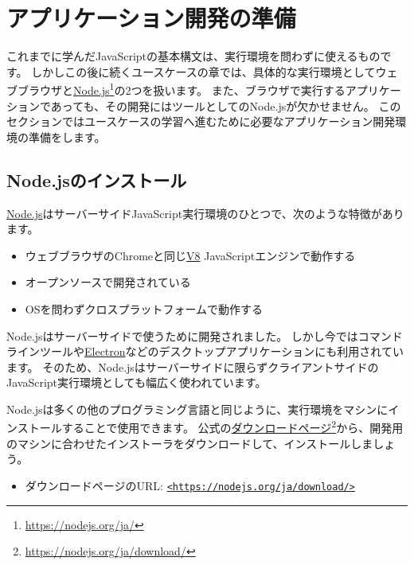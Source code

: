 \hypertarget{setup-local-env}{%
\chapter{アプリケーション開発の準備}\label{setup-local-env}}
\thispagestyle{frontheadings}

これまでに学んだJavaScriptの基本構文は、実行環境を問わずに使えるものです。
しかしこの後に続くユースケースの章では、具体的な実行環境としてウェブブラウザと\href{https://nodejs.org/ja/}{Node.js}\footnote{\url{https://nodejs.org/ja/}}の2つを扱います。
また、ブラウザで実行するアプリケーションであっても、その開発にはツールとしてのNode.jsが欠かせません。
このセクションではユースケースの学習へ進むために必要なアプリケーション開発環境の準備をします。

\hypertarget{install-nodejs}{%
\section{Node.jsのインストール}\label{install-nodejs}}

\href{https://nodejs.org/ja/}{Node.js}はサーバーサイドJavaScript実行環境のひとつで、次のような特徴があります。

\begin{itemize}
\item
  ウェブブラウザのChromeと同じ\href{https://v8.dev/}{V8}
  JavaScriptエンジンで動作する
\item
  オープンソースで開発されている
\item
  OSを問わずクロスプラットフォームで動作する
\end{itemize}

Node.jsはサーバーサイドで使うために開発されました。
しかし今ではコマンドラインツールや\href{https://www.electronjs.org/}{Electron}などのデスクトップアプリケーションにも利用されています。
そのため、Node.jsはサーバーサイドに限らずクライアントサイドのJavaScript実行環境としても幅広く使われています。

Node.jsは多くの他のプログラミング言語と同じように、実行環境をマシンにインストールすることで使用できます。
公式の\href{https://nodejs.org/ja/download/}{ダウンロードページ}\footnote{\url{https://nodejs.org/ja/download/}}から、開発用のマシンに合わせたインストーラをダウンロードして、インストールしましょう。

\begin{itemize}
\item ダウンロードページのURL: \href{https://nodejs.org/ja/download/}{\texttt{<https://nodejs.org/ja/download/>}}
\end{itemize}

